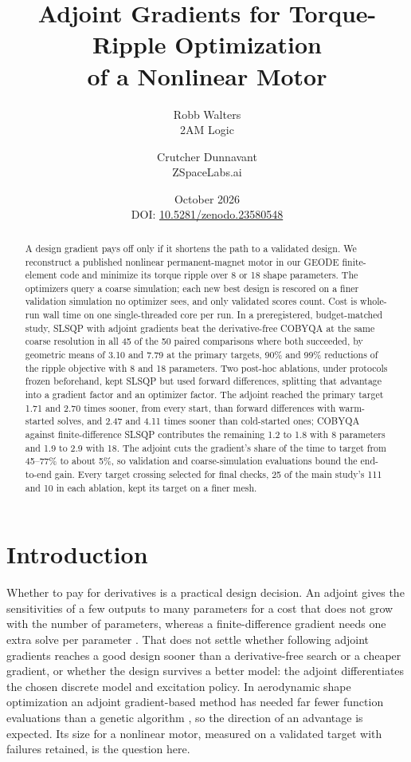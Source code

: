 \documentclass{anvil-paper}
\title{Adjoint Gradients for Torque-Ripple Optimization\\of a Nonlinear Motor}
\author{Robb Walters\\
  {\normalsize 2AM Logic}
  \and Crutcher Dunnavant\\
  {\normalsize ZSpaceLabs.ai}}
\date{October 2026\\[0.5ex]
  {\normalsize DOI: \href{https://doi.org/10.5281/zenodo.23580548}{10.5281/zenodo.23580548}}}
\begin{document}
\maketitle
\begin{abstract}
A design gradient pays off only if it shortens the path to a validated
design. We reconstruct a published nonlinear
permanent-magnet motor in our GEODE finite-element code and minimize its
torque ripple over 8 or 18 shape parameters. The optimizers query a coarse
simulation; each new best design is rescored on a finer validation
simulation no optimizer sees, and only validated scores count. Cost is
whole-run wall time on one single-threaded core per run. In a
preregistered, budget-matched study, SLSQP with adjoint gradients beat the
derivative-free COBYQA at the same coarse resolution in all 45 of the 50
paired comparisons where both succeeded, by geometric means of 3.10 and
7.79 at the primary targets, 90\% and 99\% reductions of the ripple
objective with 8 and 18 parameters. Two post-hoc ablations, under
protocols frozen beforehand, kept SLSQP but used forward differences,
splitting that advantage into a gradient factor and an optimizer factor.
The adjoint reached the primary target 1.71 and 2.70 times sooner, from
every start, than forward differences with warm-started solves, and 2.47
and 4.11 times sooner than cold-started ones; COBYQA against
finite-difference SLSQP contributes the remaining 1.2 to 1.8 with 8
parameters and 1.9 to 2.9 with 18. The adjoint cuts the gradient's share
of the time to target from 45--77\% to about 5\%, so validation and
coarse-simulation evaluations bound the end-to-end gain. Every target crossing
selected for final checks, 25 of the main study's 111 and 10 in each
ablation, kept its target on a finer mesh.
\end{abstract}

\section{Introduction}
Whether to pay for derivatives is a practical design decision. An adjoint
gives the sensitivities of a few outputs to many parameters for a cost
that does not grow with the number of parameters, whereas a
finite-difference gradient needs one extra solve per parameter
\citep{giles2000introduction,martins2013review}. That does not settle
whether following adjoint gradients reaches a good design sooner than a
derivative-free search or a cheaper gradient, or whether the design
survives a better model: the adjoint differentiates the chosen discrete
model and excitation policy. In aerodynamic shape optimization an adjoint
gradient-based method has needed far fewer function evaluations than a
genetic algorithm \citep{zingg2008comparative}, so the direction of an
advantage is expected. Its size for a nonlinear motor, measured on a
validated target with failures retained, is the question here.
\end{document}
